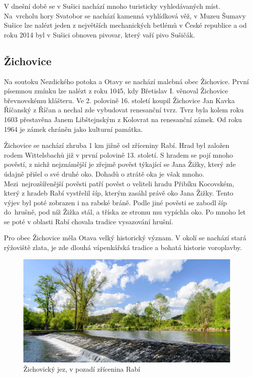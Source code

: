 \documentclass[thesis=M,czech]{FITthesis}[2012/06/26]
\begin{document}
V dnešní době se v Sušici nachází mnoho turisticky vyhledávaných míst. Na~vrcholu hory Svatobor se nachází kamenná vyhlídková věž,  v Muzeu Šumavy Sušice lze nalézt jeden z největších mechanických betlémů v České republice a od roku 2014 byl v Sušici obnoven pivovar, který vaří pivo Sušičák. \cite{SMOOS} \cite{susice}


\subsection{Žichovice}
Na soutoku Nezdického potoka a Otavy se nachází malebná obec Žichovice. První písemnou zmínku lze nalézt z roku 1045, kdy Břetislav I. věnoval Žichovice břevnovskému klášteru. Ve 2. polovině 16. století koupil Žichovice Jan Kavka Říčanský z Říčan a nechal zde vybudovat renesanční tvrz. Tvrz byla kolem roku 1603 přestavěna Janem Libštejnským z Kolovrat na renesanční zámek. Od roku 1964 je zámek chráněn jako kulturní památka. \cite{zichovice}

Žichovice se nachází zhruba 1 km jižně od zříceniny Rabí. Hrad byl založen rodem Wittelsbachů již v první polovině 13. století. S hradem se pojí mnoho pověstí, z nichž nejznámější je zřejmě pověst týkající se Jana Žižky, který zde údajně přišel o své druhé oko. Dohadů o ztrátě oka je však mnoho. Mezi~nejrozšířenější pověsti patří pověst o veliteli hradu Přibíku Kocovském, který z hradeb Rabí vystřelil šíp, kterým zasáhl právě oko Jana Žižky. Tento výjev byl poté zobrazen i na rabské bráně. Podle jiné pověsti se zabodl šíp do~hrušně, pod níž Žižka stál, a tříska ze stromu mu vypíchla oko. Po mnoho let se poté v oblasti Rabí chovala tradice vysazování hrušní. \cite{rabi}

Pro obec Žichovice měla Otava velký historický význam. V okolí se nachází stará rýžoviště zlata, je zde dlouhá vápenkářská tradice a bohatá historie voroplavby.

\begin{figure}[h!]
	\centering
	\includegraphics[width=12cm]{pics/zichovice.jpg}
	\caption{Žichovický jez, v pozadí zřícenina Rabí}
	\label{obrazek:zichovice}
\end{figure}
\end{document}
